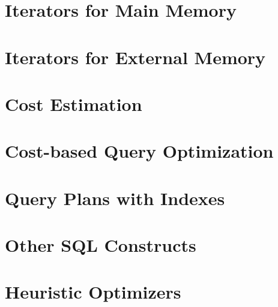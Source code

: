 \documentclass[xcolor={usenames,dvipsnames}
]{beamer}
\begin{document}

\section{Iterators for Main Memory}



\section{Iterators for External Memory}



\section{Cost Estimation}



\section{Cost-based Query Optimization}



\section{Query Plans with Indexes}



\section{Other SQL Constructs}



\section{Heuristic Optimizers}

\end{document}
